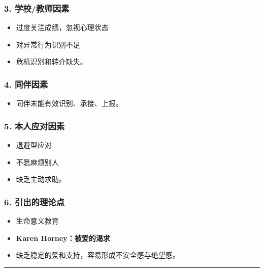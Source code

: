 \documentclass[
  a4paper,
]{ctexart}
\providecommand{\tightlist}{%
  \setlength{\itemsep}{0pt}\setlength{\parskip}{0pt}}
\begin{document}
\subsubsection{3.
学校/教师因素}\label{ux5b66ux6821ux6559ux5e08ux56e0ux7d20}

\begin{itemize}
\tightlist
\item
  过度关注成绩，忽视心理状态
\item
  对异常行为识别不足
\item
  危机识别和转介缺失。
\end{itemize}

\subsubsection{4. 同伴因素}\label{ux540cux4f34ux56e0ux7d20}

\begin{itemize}
\tightlist
\item
  同伴未能有效识别、承接、上报。
\end{itemize}

\subsubsection{5.
本人应对因素}\label{ux672cux4ebaux5e94ux5bf9ux56e0ux7d20}

\begin{itemize}
\tightlist
\item
  退避型应对
\item
  不愿麻烦别人
\item
  缺乏主动求助。
\end{itemize}

\subsubsection{6.
引出的理论点}\label{ux5f15ux51faux7684ux7406ux8bbaux70b9}

\begin{itemize}
\tightlist
\item
  生命意义教育
\item
  \textbf{Karen Horney：被爱的渴求}
\item
  缺乏稳定的爱和支持，容易形成不安全感与绝望感。
\end{itemize}

\begin{center}\rule{0.5\linewidth}{0.5pt}\end{center}
\end{document}
